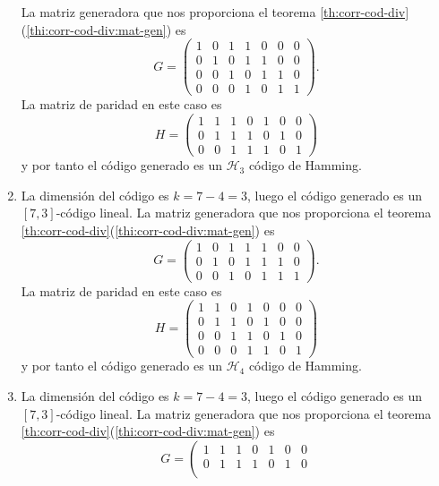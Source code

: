 \begin{example}
\begin{enumerate}
    La matriz generadora que nos proporciona el teorema \ref{th:corr-cod-div}(\ref{thi:corr-cod-div:mat-gen}) es \[
      G = \left(\begin{array}{rrrrrrr}
        1 & 0 & 1 & 1 & 0 & 0 & 0 \\
        0 & 1 & 0 & 1 & 1 & 0 & 0 \\
        0 & 0 & 1 & 0 & 1 & 1 & 0 \\
        0 & 0 & 0 & 1 & 0 & 1 & 1
        \end{array}\right).
    \]
    La matriz de paridad en este caso es \[
      H = \left(\begin{array}{rrrrrrr}
        1 & 1 & 1 & 0 & 1 & 0 & 0 \\
        0 & 1 & 1 & 1 & 0 & 1 & 0 \\
        0 & 0 & 1 & 1 & 1 & 0 & 1
        \end{array}\right)
    \]
    y por tanto el código generado es un \(\mathcal H_3\) código de Hamming.
    \item La dimensión del código es \(k = 7 - 4 = 3\), luego el código generado es un \([7, 3]\)-código lineal.
    La matriz generadora que nos proporciona el teorema \ref{th:corr-cod-div}(\ref{thi:corr-cod-div:mat-gen}) es \[
      G = \left(\begin{array}{rrrrrrr}
        1 & 0 & 1 & 1 & 1 & 0 & 0 \\
        0 & 1 & 0 & 1 & 1 & 1 & 0 \\
        0 & 0 & 1 & 0 & 1 & 1 & 1
        \end{array}\right).
    \]
    La matriz de paridad en este caso es \[
      H = \left(\begin{array}{rrrrrrr}
        1 & 1 & 0 & 1 & 0 & 0 & 0 \\
        0 & 1 & 1 & 0 & 1 & 0 & 0 \\
        0 & 0 & 1 & 1 & 0 & 1 & 0 \\
        0 & 0 & 0 & 1 & 1 & 0 & 1
        \end{array}\right)
    \]
    y por tanto el código generado es un \(\mathcal H_4\) código de Hamming.
    \item La dimensión del código es \(k = 7 - 4 = 3\), luego el código generado es un \([7, 3]\)-código lineal.
    La matriz generadora que nos proporciona el teorema \ref{th:corr-cod-div}(\ref{thi:corr-cod-div:mat-gen}) es \[
      G = \left(\begin{array}{rrrrrrr}
        1 & 1 & 1 & 0 & 1 & 0 & 0 \\
        0 & 1 & 1 & 1 & 0 & 1 & 0 \\

\end{array}\]
\end{enumerate}
\end{example}
